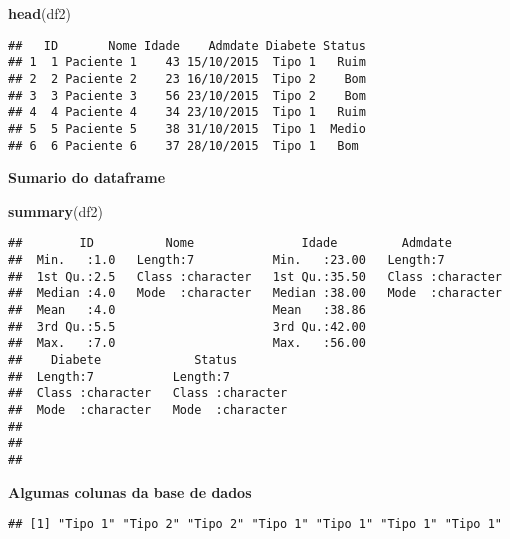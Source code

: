 \documentclass[]{article}
\newenvironment{Shaded}{\begin{snugshade}}{\end{snugshade}}
\newcommand{\KeywordTok}[1]{\textcolor[rgb]{0.13,0.29,0.53}{\textbf{#1}}}
\newcommand{\CommentTok}[1]{\textcolor[rgb]{0.56,0.35,0.01}{\textit{#1}}}
\newcommand{\OperatorTok}[1]{\textcolor[rgb]{0.81,0.36,0.00}{\textbf{#1}}}
\newcommand{\NormalTok}[1]{#1}
\begin{document}
\begin{Shaded}
\begin{Highlighting}[]
\KeywordTok{head}\NormalTok{(df2) }
\end{Highlighting}
\end{Shaded}

\begin{verbatim}
##   ID       Nome Idade    Admdate Diabete Status
## 1  1 Paciente 1    43 15/10/2015  Tipo 1   Ruim
## 2  2 Paciente 2    23 16/10/2015  Tipo 2    Bom
## 3  3 Paciente 3    56 23/10/2015  Tipo 2    Bom
## 4  4 Paciente 4    34 23/10/2015  Tipo 1   Ruim
## 5  5 Paciente 5    38 31/10/2015  Tipo 1  Medio
## 6  6 Paciente 6    37 28/10/2015  Tipo 1   Bom
\end{verbatim}

\textbf{Sumario do dataframe}

\begin{Shaded}
\begin{Highlighting}[]
\KeywordTok{summary}\NormalTok{(df2)}
\end{Highlighting}
\end{Shaded}

\begin{verbatim}
##        ID          Nome               Idade         Admdate         
##  Min.   :1.0   Length:7           Min.   :23.00   Length:7          
##  1st Qu.:2.5   Class :character   1st Qu.:35.50   Class :character  
##  Median :4.0   Mode  :character   Median :38.00   Mode  :character  
##  Mean   :4.0                      Mean   :38.86                     
##  3rd Qu.:5.5                      3rd Qu.:42.00                     
##  Max.   :7.0                      Max.   :56.00                     
##    Diabete             Status         
##  Length:7           Length:7          
##  Class :character   Class :character  
##  Mode  :character   Mode  :character  
##                                       
##                                       
## 
\end{verbatim}

\textbf{Algumas colunas da base de dados}

\begin{Shaded}
\end{Shaded}

\begin{verbatim}
## [1] "Tipo 1" "Tipo 2" "Tipo 2" "Tipo 1" "Tipo 1" "Tipo 1" "Tipo 1"
\end{verbatim}
\end{document}
